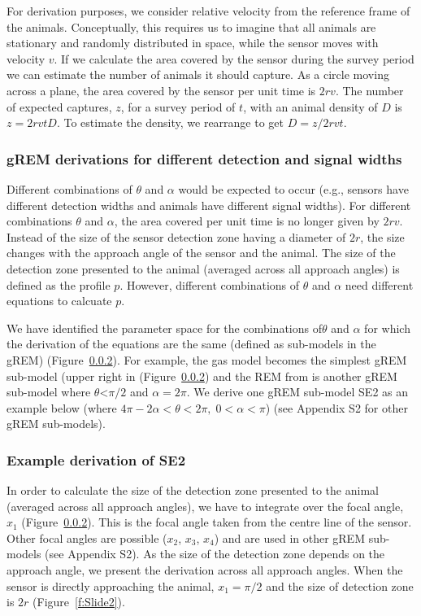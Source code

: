 \documentclass[a4paper,10pt,reqno,oneside]{amsart}
\begin{document}
For derivation purposes, we consider relative velocity from the reference frame of the animals. Conceptually, this requires us to imagine that all animals are stationary and randomly distributed in space, while the sensor moves with velocity $v$. If we calculate the area covered by the sensor during the survey period we can estimate the number of animals it should capture. As a circle moving across a plane, the area covered by the sensor per unit time is $2rv$. The number of expected captures, $z$, for a survey period of $t$, with an animal density of $D$ is $z = 2rvtD$. To estimate the density, we rearrange to get $D = z/2rvt$.

\subsubsection{gREM derivations for different detection and signal widths}
Different combinations of $\theta$ and $\alpha$ would be expected to occur (e.g., sensors have different detection widths and animals have different signal widths). For different combinations $\theta$ and $\alpha$, the area covered per unit time is no longer given by $2rv$. Instead of the size of the sensor detection zone having a diameter of $2r$, the size changes with the approach angle of the sensor and the animal. The size of the detection zone presented to the animal (averaged across all approach angles) is defined as the profile $p$. However, different combinations of $\theta$ and $\alpha$ need different equations to calcuate $p$. 

We have identified the parameter space for the combinations of$\theta$ and $\alpha$ for which the derivation of the equations are the same (defined as sub-models in the gREM) (Figure~\ref{}). For example, the gas model becomes the simplest gREM sub-model (upper right in (Figure~\ref{}) and the REM from \citep{rowcliffe2008estimating} is another gREM sub-model where $\theta$<$\pi/2$ and $\alpha = 2\pi$. We derive one gREM sub-model SE2 as an example below (where $4 \pi - 2 \alpha < \theta < 2\pi ,\; 0 < \alpha <\pi$) (see Appendix S2 for other gREM sub-models).

\subsubsection{Example derivation of SE2}

In order to calculate the size of the detection zone presented to the animal (averaged across all approach angles), we have to integrate over the focal angle, $x_1$ (Figure~\ref{}). This is the focal angle taken from the centre line of the sensor. Other focal angles are possible ($x_2$, $x_3$, $x_4$) and are used in other gREM sub-models (see Appendix S2). As the size of the detection zone depends on the approach angle, we present the derivation across all approach angles. When the sensor is directly approaching the animal, $x_1  = \pi/2$ and the size of detection zone is $2r$ (Figure~\ref{f:Slide2}). 
\end{document}
